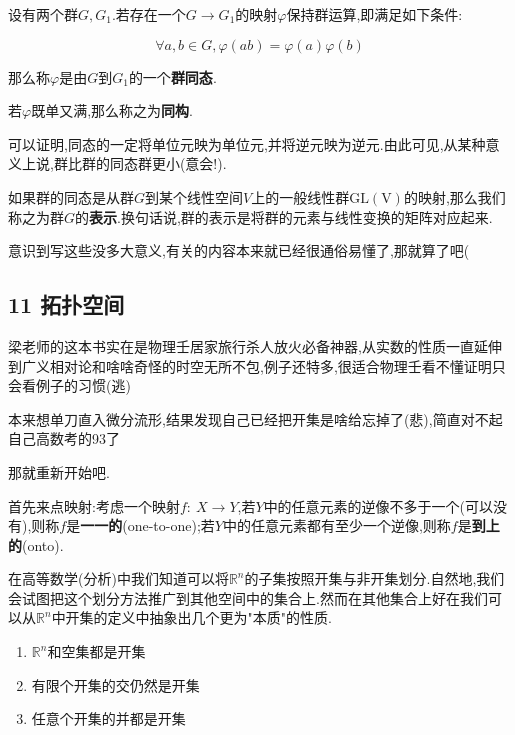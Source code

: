 \documentclass[UTF8]{article}
\begin{document}
	\begin{homomorphism}
		
		设有两个群$G,G_1$.若存在一个$G \to G_1$的映射$\varphi$保持群运算,即满足如下条件:
		
		\[\forall a,b \in G, \varphi(ab) = \varphi(a) \varphi(b) \]
		
		那么称$\varphi$是由$G$到$G_1$的一个\textbf{群同态}.
		
		若$\varphi$既单又满,那么称之为\textbf{同构}.
		
	\end{homomorphism}
	
	可以证明,同态的一定将单位元映为单位元,并将逆元映为逆元.由此可见,从某种意义上说,群比群的同态群更小(意会!).
	
	如果群的同态是从群$G$到某个线性空间$V$上的一般线性群$\mathrm{GL(V)}$的映射,那么我们称之为群$G$的\textbf{表示}.换句话说,群的表示是将群的元素与线性变换的矩阵对应起来.
	
	意识到写这些没多大意义,有关的内容本来就已经很通俗易懂了,那就算了吧(
	
	\newpage
	
	
	
	
	
	
	
\subsection*{11 拓扑空间\cite{LiangKunMiao}}
	
	梁老师的这本书实在是物理壬居家旅行杀人放火必备神器,从实数的性质一直延伸到广义相对论和啥啥奇怪的时空无所不包,例子还特多,很适合物理壬看不懂证明只会看例子的习惯(逃)
	
	本来想单刀直入微分流形,结果发现自己已经把开集是啥给忘掉了(悲),简直对不起自己高数考的93了
	
	那就重新开始吧.
	
	首先来点映射:考虑一个映射$f:~X\to Y$,若$Y$中的任意元素的逆像不多于一个(可以没有),则称$f$是\textbf{一一的}(one-to-one);若$Y$中的任意元素都有至少一个逆像,则称$f$是\textbf{到上的}(onto).
	
	在高等数学(分析)中我们知道可以将$\mathbb{R}^n$的子集按照开集与非开集划分.自然地,我们会试图把这个划分方法推广到其他空间中的集合上.然而在其他集合上好在我们可以从$\mathbb{R}^n$中开集的定义中抽象出几个更为"本质"的性质.
	
	\begin{enumerate}
		\item $\mathbb{R}^n$和空集都是开集
		\item 有限个开集的交仍然是开集
		\item 任意个开集的并都是开集
	\end{enumerate}
	
\end{document}
